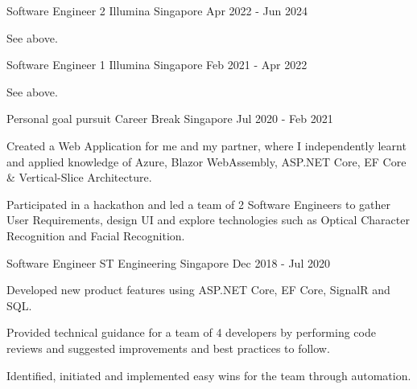 \begin{cventries}
\cventry
{Software Engineer 2} %
{Illumina} %
{Singapore} %
{Apr 2022 - Jun 2024} %
{
  \begin{cvitems} %
    \item {See above.}
  \end{cvitems}
}

\cventry
{Software Engineer 1} %
{Illumina} %
{Singapore} %
{Feb 2021 - Apr 2022} %
{
  \begin{cvitems} %
    \item {See above.}
  \end{cvitems}
}

\cventry
{Personal goal pursuit} %
{Career Break} %
{Singapore} %
{Jul 2020 - Feb 2021} %
{
  \begin{cvitems} %
    \item {Created a Web Application for me and my partner, where I independently learnt and applied knowledge of Azure, Blazor WebAssembly, ASP.NET Core, EF Core \& Vertical-Slice Architecture.}
    \item {Participated in a hackathon and led a team of 2 Software Engineers to gather User Requirements, design UI and explore technologies such as Optical Character Recognition and Facial Recognition.}
  \end{cvitems}
}

  \cventry
    {Software Engineer} %
    {ST Engineering} %
    {Singapore} %
    {Dec 2018 - Jul 2020} %
    {
      \begin{cvitems} %
        \item {Developed new product features using ASP.NET Core, EF Core, SignalR and SQL.}
        \item {Provided technical guidance for a team of 4 developers by performing code reviews and suggested improvements and best practices to follow.}
        \item {Identified, initiated and implemented easy wins for the team through automation.}
      \end{cvitems}
    }


\end{cventries}
